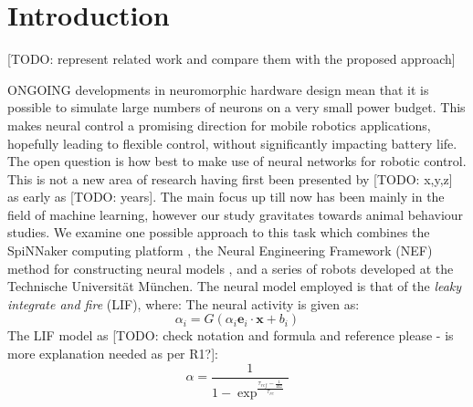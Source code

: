 \documentclass[conference]{IEEEtran}
\begin{document}
\IEEEpeerreviewmaketitle


\section{Introduction}

[TODO: represent related work and compare them with the proposed approach]

ONGOING developments in neuromorphic hardware design mean that it is possible to simulate large numbers of neurons on a very small power budget. This makes neural control a promising direction for mobile robotics applications, hopefully leading to flexible control, without significantly impacting battery life. The open question is how best to make use of neural networks for robotic control. This is not a new area of research having first been presented by [TODO: x,y,z] as early as [TODO: years]. The main focus up till now has been mainly in the field of machine learning, however our study gravitates towards animal behaviour studies. We examine one possible approach to this task which combines the SpiNNaker computing platform \cite{furber2007neural, furber2014spinnaker}, the Neural Engineering Framework (NEF) method for constructing neural models \cite{eliasmith2004neural}, and a series of robots developed at the Technische Universit{\"a}t M{\"u}nchen. The neural model employed is that of the \textit{leaky integrate and fire} (LIF), where:
The neural activity is given as:
\begin{equation}
\alpha_i = G(\alpha_i \textbf{e}_i \cdot \textbf{x} + \textit{b}_i )
\end{equation}
The LIF model as \cite{gerstner2002spiking} [TODO: check notation and formula and reference please - is more explanation needed as per R1?]:
\begin{equation}
\alpha = \frac{1}{1-\exp^\frac{\tau_{ref}-\frac{1}{\mathit{Hz}}}{\tau_{rc}}}
\end{equation}
\end{document}
